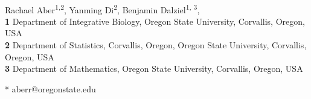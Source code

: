 \documentclass[10pt,letterpaper]{article}
\begin{document}
\vspace*{0.2in}

\begin{flushleft}
{\Large
\textbf{} %
}
\newline
\\
Rachael Aber\textsuperscript{1,2},
Yanming Di\textsuperscript{2},
Benjamin Dalziel\textsuperscript{1, 3},
\\
\bigskip
\textbf{1} Department of Integrative Biology, Oregon State University, Corvallis, Oregon, USA
\\
\textbf{2} Department of Statistics, Corvallis, Oregon, Oregon State University, Corvallis, Oregon, USA
\\
\textbf{3} Department of Mathematics, Oregon State University, Corvallis, Oregon, USA
\bigskip

% 
%





* aberr@oregonstate.edu

\end{flushleft}
\end{document}
